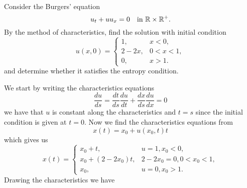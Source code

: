 \newpage
\begin{exercise}
    Consider the Burgers' equation
    \[
        u_t + u u_x = 0 \quad \text{in } \mathbb{R} \times \mathbb{R}^+.
    \]
    By the method of characteristics, find the solution with initial condition
    \[
        u(x,0) = \begin{cases}
            1, & x < 0, \\
            2 - 2x, & 0 < x < 1, \\
            0, & x > 1.
        \end{cases}
    \]
    and determine whether it satisfies the entropy condition.
\end{exercise}
We start by writing the characteristics equations
\[
    \frac{du}{ds} = \frac{dt}{ds} \frac{du}{dt} + \frac{dx}{ds} \frac{du}{dx} = 0
\]
we have that \(u\) is constant along the characteristics and \(t=s\) since the initial condition is given at \(t=0\). 
Now we find the characteristics equations from 
\[
    x(t) = x_0 + u(x_0, t) t
\]
which gives us
\[
    x(t) = \begin{cases}
        x_0 + t, & u = 1, x_0 < 0, \\
        x_0 + (2 - 2x_0)t, & 2 - 2x_0 = 0, 0 < x_0 < 1, \\
        x_0, & u = 0, x_0 > 1.
    \end{cases}
\]
Drawing the characteristics we have
